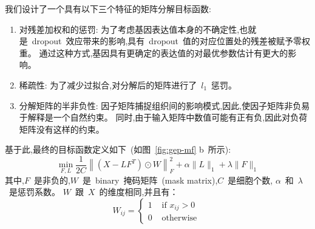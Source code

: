 我们设计了一个具有以下三个特征的矩阵分解目标函数: 
\begin{enumerate}
    \item 对残差加权和的惩罚: 为了考虑基因表达值本身的不确定性,也就是~dropout~效应带来的影响,具有~dropout~值的对应位置处的残差被赋予零权重。
          通过这种方式,基因具有更确定的表达值的对最优参数估计有更大的影响。
    \item 稀疏性: 为了减少过拟合,对分解后的矩阵进行了~$l_1$~惩罚。
    \item 分解矩阵的半非负性: 因子矩阵捕捉组织间的影响模式,因此,使因子矩阵非负易于解释是一个自然约束。
          同时,由于输入矩阵中数值可能有正有负,因此对负荷矩阵没有这样的约束。
\end{enumerate}
基于此,最终的目标函数定义如下~(如图~\ref{fig:gep-mf} b~所示):
\begin{equation}
    \label{eq:obj}
    \min _{F, L} \frac{1}{2 C}\left\|\left(X-L F^{T}\right) \odot W\right\|_{F}^{2}+\alpha\|L\|_{1}+\lambda\|F\|_{1}
\end{equation}
其中,$F$~是非负的,$W$~是~binary~掩码矩阵~(mask matrix),$C$~是细胞个数,
$\alpha$~和~$\lambda$~是惩罚系数。
$W$~跟~$X$~的维度相同,并且有：
\begin{equation}
    W_{i j}=\left\{\begin{array}{ll}1 & \text { if } x_{i j}>0 \\ 0 & \text { otherwise }\end{array}\right.
\end{equation}

